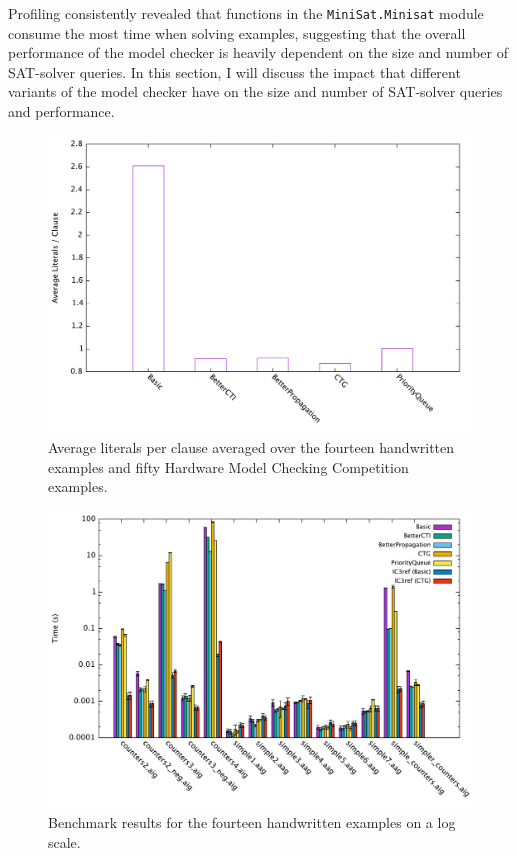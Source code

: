 \documentclass[12pt,a4paper,twoside,openright]{report}
\begin{document}
{Profiling consistently revealed that functions in the \verb,MiniSat.Minisat, module consume the most time
when solving examples, suggesting that the overall performance of the model checker is heavily dependent on
the size and number of SAT-solver queries. In this section, I will discuss the impact that different
variants of the model checker have on the size and number of SAT-solver queries and performance.

\begin{figure}[t]
\includegraphics[width=16cm]{litspercls.pdf}
\caption{Average literals per clause averaged over the fourteen handwritten examples and fifty Hardware
Model Checking Competition examples.}
\end{figure}

\begin{figure}[t]
\includegraphics[width=16cm]{handwritten.pdf}
\caption{Benchmark results for the fourteen handwritten examples on a log scale.}
\end{figure}

}
\end{document}
